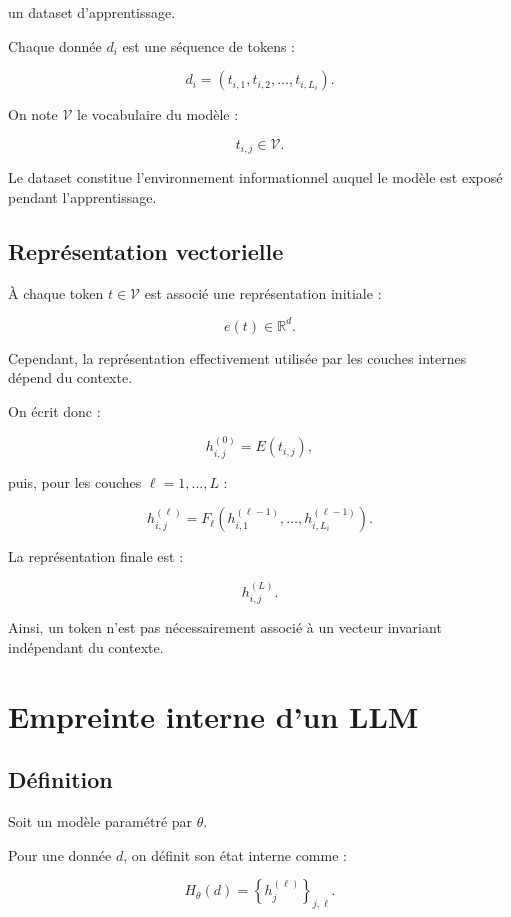 \documentclass[11pt,a4paper]{article}
\newcommand{\R}{\mathbb R}
\begin{document}
un dataset d'apprentissage.

Chaque donnée $d_i$ est une séquence de tokens :

\[
d_i=(t_{i,1},t_{i,2},\ldots,t_{i,L_i}).
\]

On note $\mathcal V$ le vocabulaire du modèle :

\[
t_{i,j}\in\mathcal V.
\]

Le dataset constitue l'environnement informationnel auquel le modèle est
exposé pendant l'apprentissage.

\subsection{Représentation vectorielle}

À chaque token $t\in\mathcal V$ est associé une représentation initiale :

\[
e(t)\in\R^{d}.
\]

Cependant, la représentation effectivement utilisée par les couches internes
dépend du contexte.

On écrit donc :

\[
h_{i,j}^{(0)}
=
E(t_{i,j}),
\]

puis, pour les couches $\ell=1,\ldots,L$ :

\[
h_{i,j}^{(\ell)}
=
F_{\ell}
\left(
h_{i,1}^{(\ell-1)},
\ldots,
h_{i,L_i}^{(\ell-1)}
\right).
\]

La représentation finale est :

\[
h_{i,j}^{(L)}.
\]

Ainsi, un token n'est pas nécessairement associé à un vecteur invariant
indépendant du contexte.

\section{Empreinte interne d'un LLM}

\subsection{Définition}

Soit un modèle paramétré par $\theta$.

Pour une donnée $d$, on définit son état interne comme :

\[
H_\theta(d)
=
\left\{
h_{j}^{(\ell)}
\right\}_{j,\ell}.
\]
\end{document}
